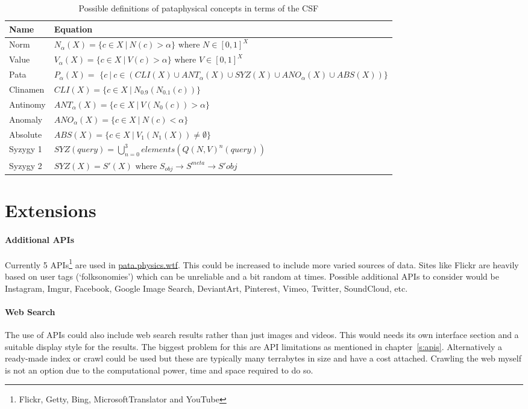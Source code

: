 \begin{table}[!htbp]
\centering
\caption[CSF pataphysical concepts]{Possible definitions of pataphysical concepts in terms of the CSF}
\label{tab:patacsf}
\begin{tabu}{XX[5]} 
\toprule
\textbf{Name} & \textbf{Equation} \\
\midrule
Norm & $N_\alpha (X) = \{c \in X \ | \ N(c)> \alpha\} \text{ where } N \in [0,1]^X$ \\
Value & $V_\alpha(X) = \{c \in X \ | \ V(c) > \alpha\} \text{ where } V \in [0,1]^X$ \\
Pata & $P_\alpha(X) = $ \newline $\{c \ | \ c \in(CLI(X)\cup ANT_\alpha(X) \cup SYZ(X) \cup ANO_\alpha(X) \cup ABS(X))\}$ \\
Clinamen & $CLI(X) = \{c \in X \ | \ N_{0.9} (N_{0.1} (c))\}$ \\
Antinomy & $ANT_\alpha(X) = \{c \in X \ | \ V(N_0(c)) > \alpha\}$ \\
Anomaly & $ANO_\alpha(X) = \{c \in X \ | \ N(c)< \alpha\}$ \\
Absolute & $ABS(X) = \{c \in X \ | \ V_1 (N_1 (X)) \neq \emptyset\}$ \\
Syzygy 1 & $SYZ(query) = \bigcup_{n=0}^{3} elements(Q(N,V)^n (query))$ \\
Syzygy 2 & $SYZ(X) = S'(X) \text{ where } S_{obj} \rightarrow S^{meta} \rightarrow S'{obj}$ \\
\bottomrule
\end{tabu}
\end{table}


\section{Extensions}

\paragraph{Additional APIs} 
Currently 5 \ac{API}s\footnote{Flickr, Getty, Bing, MicrosoftTranslator and YouTube} are used in \url{pata.physics.wtf}. This could be increased to include more varied sources of data. Sites like Flickr are heavily based on user tags (`folksonomies') which can be unreliable and a bit random at times. Possible additional \ac{API}s to consider would be Instagram, Imgur, Facebook, Google Image Search, DeviantArt, Pinterest, Vimeo, Twitter, SoundCloud, etc.

\paragraph{Web Search} 
The use of \ac{API}s could also include web search results rather than just images and videos. This would needs its own interface section and a suitable display style for the results. The biggest problem for this are \ac{API} limitations as mentioned in chapter~\ref{s:apis}. Alternatively a ready-made index or crawl could be used but these are typically many terrabytes in size and have a cost attached. Crawling the web myself is not an option due to the computational power, time and space required to do so.

